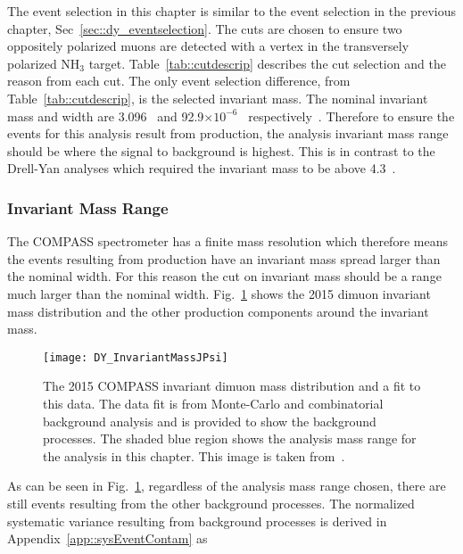 The event selection in this chapter is similar to the event selection in the
previous chapter, Sec~\ref{sec::dy_eventselection}.  The cuts are chosen to
ensure two oppositely polarized muons are detected with a vertex in the
transversely polarized NH$_3$ target.  Table~\ref{tab::cutdescrip} describes the
cut selection and the reason from each cut.  The only event selection
difference, from Table~\ref{tab::cutdescrip}, is the selected invariant mass.
The nominal {\jp} invariant mass and width are 3.096~{\gvcw} and
92.9$\times10^{-6}$~{\gvcw} respectively~\cite{Tanabashi:2018oca}.  Therefore to
ensure the events for this analysis result from {\jp} production, the analysis
invariant mass range should be where the {\jp} signal to background is highest.
This is in contrast to the Drell-Yan analyses which required the invariant mass
to be above 4.3~{\gvcw}.

\subsubsection{{\jp} Invariant Mass Range}\label{sec::jpMassRange}
The COMPASS spectrometer has a finite mass resolution which therefore means the
events resulting from {\jp} production have an invariant mass spread larger than
the nominal {\jp} width.  For this reason the cut on invariant mass should be a
range much larger than the nominal {\jp} width.
Fig.~\ref{fig::DY_InvariantMassJPsi} shows the 2015 dimuon invariant mass
distribution and the other production components around the {\jp} invariant
mass.

\begin{figure}[h!t]
  \centering \texttt{[image: DY\_InvariantMassJPsi]}
  \caption{The 2015 COMPASS invariant dimuon mass distribution and a fit to this
    data.  The data fit is from Monte-Carlo and combinatorial background
    analysis and is provided to show the background processes.  The shaded blue
    region shows the analysis mass range for the analysis in this chapter.  This
    image is taken from~\cite{compassDYpaper}.}
  \label{fig::DY_InvariantMassJPsi}
\end{figure}

As can be seen in Fig.~\ref{fig::DY_InvariantMassJPsi}, regardless of the
analysis mass range chosen, there are still events resulting from the other
background processes.  The normalized systematic variance resulting from
background processes is derived in Appendix~\ref{app::sysEventContam} as

